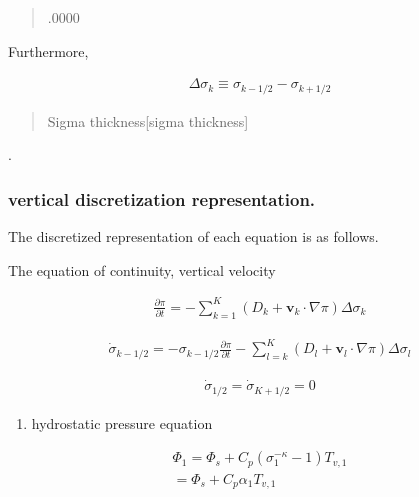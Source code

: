 \begin{quote}
\blindness.0000
\end{quote}

Furthermore,

\begin{eqnarray}
  \Delta \sigma_k \equiv \sigma_{k-1/2} - \sigma_{k+1/2}
\end{eqnarray}

\begin{quote}
\protect\hypertarget{sigmaux20thickness}{}{Sigma thickness{[}sigma
thickness{]}}
\end{quote}

.

\hypertarget{vertical-discretization-representation.}{%
\subsubsection{vertical discretization
representation.}\label{vertical-discretization-representation.}}

The discretized representation of each equation is as follows.

The equation of continuity, vertical velocity

\begin{eqnarray}
  \frac{\partial \pi}{\partial t}
 = - \sum_{k=1}^{K} ( D_k + \mathbf{v}_k \cdot \nabla \pi ) 
       \Delta  \sigma_k
\end{eqnarray}

\begin{eqnarray}
  \dot{\sigma}_{k-1/2}
 = - \sigma_{k-1/2} \frac{\partial \pi}{\partial t}
   - \sum_{l=k}^{K} ( D_l + \mathbf{v}_l \cdot \nabla \pi )          
       \Delta  \sigma_l
\end{eqnarray}

\begin{eqnarray}
  \dot{\sigma}_{1/2} = \dot{\sigma}_{K+1/2} = 0
\end{eqnarray}

\begin{enumerate}
\def\labelenumi{\arabic{enumi}.}
\setcounter{enumi}{1}
\tightlist
\item
  hydrostatic pressure equation
\end{enumerate}

\begin{eqnarray}
 \Phi_{1}  =  \Phi_{s} + C_{p} ( \sigma_{1}^{-\kappa} - 1  ) T_{v,1} \\
           =  \Phi_{s} + C_{p} \alpha_{1} T_{v,1} 
\end{eqnarray}

